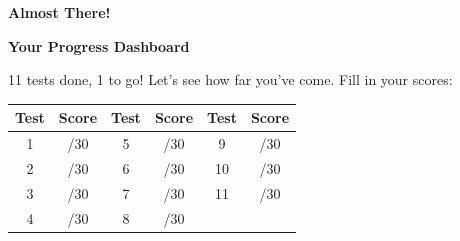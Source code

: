 \clearpage
\thispagestyle{empty}
{\sffamily

\begin{center}
{\fontsize{22}{26}\selectfont\bfseries\color{funPurple} \faFlagCheckered\hspace{3mm}Almost There!\hspace{3mm}\faFlagCheckered}

\vspace{2mm}
{\color{funGray}\hrulefill}
\end{center}

\vspace{3mm}

\begin{tcolorbox}[
    enhanced,
    colback=funPurpleLight,
    colframe=funPurple!50,
    arc=10pt,
    boxrule=1.5pt,
    left=6mm, right=6mm, top=5mm, bottom=5mm,
]
{\large\bfseries\color{funPurpleDark} \faClipboardList\hspace{2mm}Your Progress Dashboard}

\vspace{2mm}

11 tests done, 1 to go! Let's see how far you've come. Fill in your scores:

\vspace{3mm}

\begin{center}
\renewcommand{\arraystretch}{1.3}
\begin{tabular}{|c|c||c|c||c|c|}
\hline
\rowcolor{funPurple!15} \textbf{Test} & \textbf{Score} & \textbf{Test} & \textbf{Score} & \textbf{Test} & \textbf{Score} \\
\hline
1 & \hspace{0.6cm}/30 & 5 & \hspace{0.6cm}/30 & 9 & \hspace{0.6cm}/30 \\
\hline
2 & \hspace{0.6cm}/30 & 6 & \hspace{0.6cm}/30 & 10 & \hspace{0.6cm}/30 \\
\hline
3 & \hspace{0.6cm}/30 & 7 & \hspace{0.6cm}/30 & 11 & \hspace{0.6cm}/30 \\
\hline
4 & \hspace{0.6cm}/30 & 8 & \hspace{0.6cm}/30 & & \\
\hline
\end{tabular}
\end{center}


\end{tcolorbox}}
